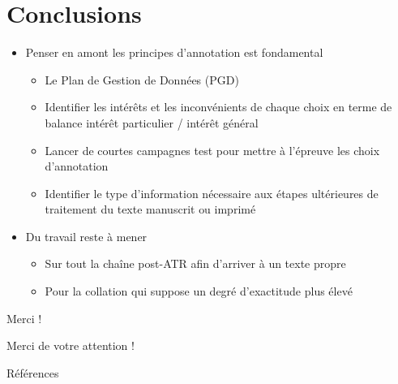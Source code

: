 \documentclass[11pt,aspectratio=169]{beamer}
\begin{document}
\section{Conclusions}


\begin{frame}
\begin{center}


\end{center}
\end{frame}


\begin{frame}
\begin{itemize}
\item Penser en amont les principes d'annotation est fondamental
\begin{itemize}
\item Le Plan de Gestion de Données (PGD)
\item Identifier les intérêts et les inconvénients de chaque choix en terme de balance intérêt particulier / intérêt général
\item Lancer de courtes campagnes test pour mettre à l'épreuve les choix d'annotation
\item Identifier le type d'information nécessaire aux étapes ultérieures de traitement du texte manuscrit ou imprimé
\end{itemize}
\item Du travail reste à mener
\begin{itemize}
\item Sur tout la chaîne post-ATR afin d'arriver à un texte propre
\item Pour la collation qui suppose un degré d'exactitude plus élevé
\end{itemize}
\end{itemize}
\end{frame}


\begin{frame}{Merci !}
\begin{center}
Merci de votre attention !
\end{center}
\end{frame}



\begin{frame}[allowframebreaks]{Références}
\printbibliography
\end{frame}
\end{document}
